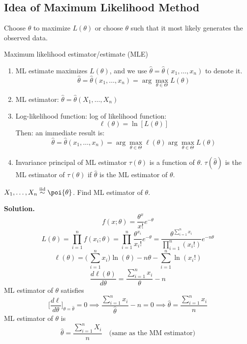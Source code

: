 \subsection*{Idea of Maximum Likelihood Method}
Choose $ \theta $ to maximize $ L(\theta) $ or choose
$ \theta $ such that it most likely generates the observed data.

Maximum likelihood estimator/estimate (MLE)
\begin{enumerate}
    \item ML estimate maximizes $ L(\theta) $, and we use
          $ \hat{\theta}=\hat{\theta}(x_1,\ldots,x_n) $ to denote it.
          \[ \hat{\theta}=\hat{\theta}(x_1,\ldots,x_n)=
              \arg\max_{\theta\in \Theta}L(\theta) \]
    \item ML estimator: $ \hat{\theta}=\hat{\theta}(X_1,\ldots,X_n) $
    \item Log-likelihood function: log of likelihood function:
          \[ \ell(\theta)=\ln[L(\theta)] \]
          Then: an immediate result is:
          \[ \hat{\theta}=\hat{\theta}(x_1,\ldots,x_n)=
              \arg\max_{\theta\in \Theta}\ell(\theta)
              \arg\max_{\theta\in \Theta}L(\theta) \]
    \item Invariance principal of ML estimator
          $ \tau(\theta) $ is a function of $ \theta $.
          $ \tau(\hat{\theta}) $ is the ML estimator of
          $ \tau(\theta) $ if $ \hat{\theta} $ is the ML
          estimator of $ \theta $.
\end{enumerate}
\begin{Example}{}{}
    $ X_1,\ldots,X_n \stackrel{\text{iid}}{\sim} \poi{\theta} $.
    Find ML estimator of $ \theta $.

    \textbf{Solution.}
    \[ f(x;\theta)=\frac{\theta^x}{x!} e^{-\theta} \]
    \[ L(\theta)=\prod_{i=1}^n f(x_i;\theta)=
        \prod_{i=1}^n \frac{\theta^{x_i}}{x_i!}e^{-\theta}=
        \frac{\theta^{\sum_{i=1}^{n} x_i}}{\prod_{i=1}^n(x_i!)}e^{-n\theta}   \]
    \[ \ell(\theta)=\biggl(\,\sum_{i=1}^{n} x_i\biggr)\ln(\theta)-n \theta-
        \sum_{i=1}^{n} \ln(x_i!) \]
    \[ \frac{d\ell(\theta)}{d\theta}=\frac{\sum_{i=1}^{n} x_i}{\theta}-n   \]
    ML estimator of $ \theta $ satisfies
    \[ \biggl[\frac{d\ell}{d\theta}\biggr]_{\theta=\hat{\theta}}=0\implies
        \frac{\sum_{i=1}^{n} x_i}{\hat{\theta}}-n=0\implies
        \hat{\theta}=\frac{\sum_{i=1}^{n} x_i}{n}   \]
    ML estimator of $ \theta $ is
    \[ \hat{\theta}=\frac{\sum_{i=1}^{n} X_i}{n}\quad\text{(same as the MM estimator)} \]
\end{Example}
